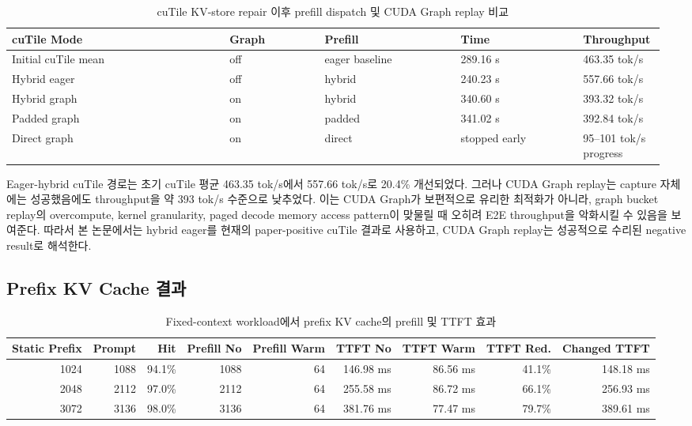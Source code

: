 \documentclass{kcc}
\begin{document}
\begin{table}[h]
\centering
\scriptsize
\setlength{\tabcolsep}{2pt}
\begin{tabular}{|p{0.32\linewidth}|p{0.14\linewidth}|p{0.20\linewidth}|p{0.18\linewidth}|p{0.12\linewidth}|}
\hline
\textbf{cuTile Mode} & \textbf{Graph} & \textbf{Prefill} & \textbf{Time} & \textbf{Throughput} \\ \hline
Initial cuTile mean & off & eager baseline & 289.16 s & 463.35 tok/s \\ \hline
Hybrid eager & off & hybrid & 240.23 s & 557.66 tok/s \\ \hline
Hybrid graph & on & hybrid & 340.60 s & 393.32 tok/s \\ \hline
Padded graph & on & padded & 341.02 s & 392.84 tok/s \\ \hline
Direct graph & on & direct & stopped early & 95--101 tok/s progress \\ \hline
\end{tabular}
\caption{cuTile KV-store repair 이후 prefill dispatch 및 CUDA Graph replay 비교}
\end{table}

Eager-hybrid cuTile 경로는 초기 cuTile 평균 463.35 tok/s에서 557.66 tok/s로 20.4\% 개선되었다. 그러나 CUDA Graph replay는 capture 자체에는 성공했음에도 throughput을 약 393 tok/s 수준으로 낮추었다. 이는 CUDA Graph가 보편적으로 유리한 최적화가 아니라, graph bucket replay의 overcompute, kernel granularity, paged decode memory access pattern이 맞물릴 때 오히려 E2E throughput을 악화시킬 수 있음을 보여준다. 따라서 본 논문에서는 hybrid eager를 현재의 paper-positive cuTile 결과로 사용하고, CUDA Graph replay는 성공적으로 수리된 negative result로 해석한다.
\subsection{Prefix KV Cache 결과}

\begin{table}[t]
\centering
\scriptsize
\setlength{\tabcolsep}{2pt}
\begin{tabular}{|r|r|r|r|r|r|r|r|r|}
\hline
\textbf{Static Prefix} & \textbf{Prompt} & \textbf{Hit} & \textbf{Prefill No} & \textbf{Prefill Warm} & \textbf{TTFT No} & \textbf{TTFT Warm} & \textbf{TTFT Red.} & \textbf{Changed TTFT} \\ \hline
1024 & 1088 & 94.1\% & 1088 & 64 & 146.98 ms & 86.56 ms & 41.1\% & 148.18 ms \\ \hline
2048 & 2112 & 97.0\% & 2112 & 64 & 255.58 ms & 86.72 ms & 66.1\% & 256.93 ms \\ \hline
3072 & 3136 & 98.0\% & 3136 & 64 & 381.76 ms & 77.47 ms & 79.7\% & 389.61 ms \\ \hline
\end{tabular}
\caption{Fixed-context workload에서 prefix KV cache의 prefill 및 TTFT 효과}
\end{table}
\end{document}
